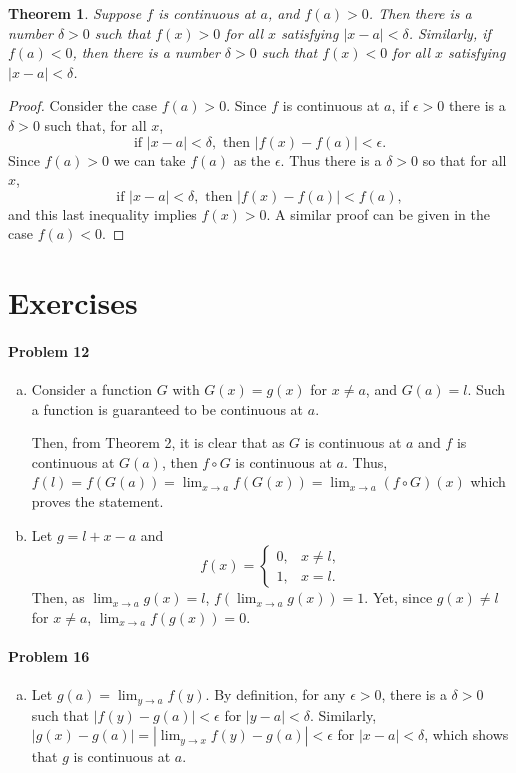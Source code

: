 \documentclass{article}
\newtheorem{theorem}{Theorem}
\begin{document}
\begin{theorem}
  Suppose $f$ is continuous at $a$, and $f(a) > 0$. Then there is a number
  $\delta > 0$ such that $f(x) > 0$ for all $x$ satisfying $|x - a| < \delta$.
  Similarly, if $f(a) < 0$, then there is a number $\delta > 0$ such that $f(x)
  < 0$ for all $x$ satisfying $|x - a| < \delta$.
\end{theorem}
\begin{proof}
  Consider the case $f(a) > 0$. Since $f$ is continuous at $a$, if $\epsilon >
  0$ there is a $\delta > 0$ such that, for all $x$, \[
    \text{if } |x - a| < \delta, \text{ then } |f(x) - f(a)| < \epsilon.
  \] Since $f(a) > 0$ we can take $f(a)$ as the $\epsilon$. Thus there is a
  $\delta > 0$ so that for all $x$, \[
    \text{if } |x - a| < \delta, \text{ then } |f(x) - f(a)| < f(a),
  \] and this last inequality implies $f(x) > 0$. A similar proof can be given
  in the case $f(a) < 0$.
\end{proof}

\section*{Exercises}

\paragraph{Problem 12}
\begin{enumerate}[(a)]
  \item Consider a function $G$ with $G(x) = g(x)$ for $x \neq a$, and $G(a) =
    l$. Such a function is guaranteed to be continuous at $a$.

    Then, from Theorem 2, it is clear that as $G$ is continuous at $a$ and $f$
    is continuous at $G(a)$, then $f \circ G$ is continuous at $a$. Thus, $f(l)
    = f(G(a)) = \lim_{x \to a} f(G(x)) = \lim_{x \to a} (f \circ G)(x)$ which
    proves the statement.
  \item Let $g = l + x - a$ and \[
    f(x) = \begin{cases}
      0, &x \neq l, \\
      1, &x = l.
    \end{cases}
  \] Then, as $\lim_{x \to a} g(x) = l$, $f(\lim_{x \to a} g(x)) = 1$. Yet,
  since $g(x) \neq l$ for $x \neq a$, $\lim_{x \to a} f(g(x)) = 0$.
\end{enumerate}

\paragraph{Problem 16}
\begin{enumerate}[(d)]
  \item Let $g(a) = \lim_{y \to a}f(y)$. By definition, for any $\epsilon > 0$,
    there is a $\delta > 0$ such that $|f(y) - g(a)| < \epsilon$ for $|y - a| <
    \delta$. Similarly, $|g(x) - g(a)| = |\lim_{y \to x} f(y) - g(a)| <
    \epsilon$ for $|x - a| < \delta$, which shows that $g$ is continuous at
    $a$.
\end{enumerate}
\end{document}
